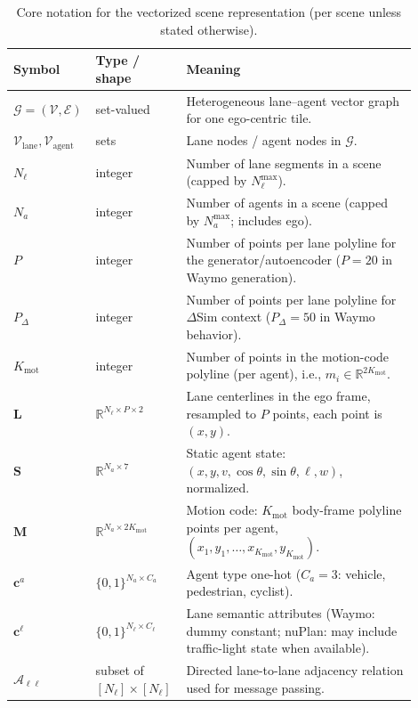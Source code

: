 \documentclass{article}
\theoremstyle{plain}
\theoremstyle{definition}
\theoremstyle{remark}
\begin{document}
\begin{table}[ht]
\centering
\small
\caption{Core notation for the vectorized scene representation (per scene unless stated otherwise).}
\label{tab:app-notation-scene}
\begin{tabular}{p{0.12\linewidth}p{0.22\linewidth}p{0.56\linewidth}}
\toprule
Symbol & Type / shape & Meaning \\
\midrule
\(\mathcal{G}=(\mathcal{V},\mathcal{E})\) & set-valued & Heterogeneous lane--agent vector graph for one ego-centric tile. \\
\(\mathcal{V}_{\mathrm{lane}},\mathcal{V}_{\mathrm{agent}}\) & sets & Lane nodes / agent nodes in \(\mathcal{G}\). \\
\(N_{\ell}\) & integer & Number of lane segments in a scene (capped by \(N_{\ell}^{\max}\)). \\
\(N_{a}\) & integer & Number of agents in a scene (capped by \(N_{a}^{\max}\); includes ego). \\
\(P\) & integer & Number of points per lane polyline for the generator/autoencoder (\(P{=}20\) in Waymo generation). \\
\(P_{\Delta}\) & integer & Number of points per lane polyline for \(\Delta\)Sim context (\(P_{\Delta}{=}50\) in Waymo behavior). \\
\(K_{\mathrm{mot}}\) & integer & Number of points in the motion-code polyline (per agent), i.e., \(m_i\in\mathbb{R}^{2K_{\mathrm{mot}}}\). \\
\(\mathbf{L}\) & \(\mathbb{R}^{N_{\ell}\times P \times 2}\) & Lane centerlines in the ego frame, resampled to \(P\) points, each point is \((x,y)\). \\
\(\mathbf{S}\) & \(\mathbb{R}^{N_{a}\times 7}\) & Static agent state: \((x,y,v,\cos\theta,\sin\theta,\ell,w)\), normalized. \\
\(\mathbf{M}\) & \(\mathbb{R}^{N_{a}\times 2K_{\mathrm{mot}}}\) & Motion code: \(K_{\mathrm{mot}}\) body-frame polyline points per agent, \((x_1,y_1,\dots,x_{K_{\mathrm{mot}}},y_{K_{\mathrm{mot}}})\). \\
\(\mathbf{c}^{a}\) & \(\{0,1\}^{N_{a}\times C_a}\) & Agent type one-hot (\(C_a{=}3\): vehicle, pedestrian, cyclist). \\
\(\mathbf{c}^{\ell}\) & \(\{0,1\}^{N_{\ell}\times C_{\ell}}\) & Lane semantic attributes (Waymo: dummy constant; nuPlan: may include traffic-light state when available). \\
\(\mathcal{A}_{\ell\ell}\) & subset of \([N_{\ell}]\times[N_{\ell}]\) & Directed lane-to-lane adjacency relation used for message passing. \\

\end{tabular}
\end{table}
\end{document}
